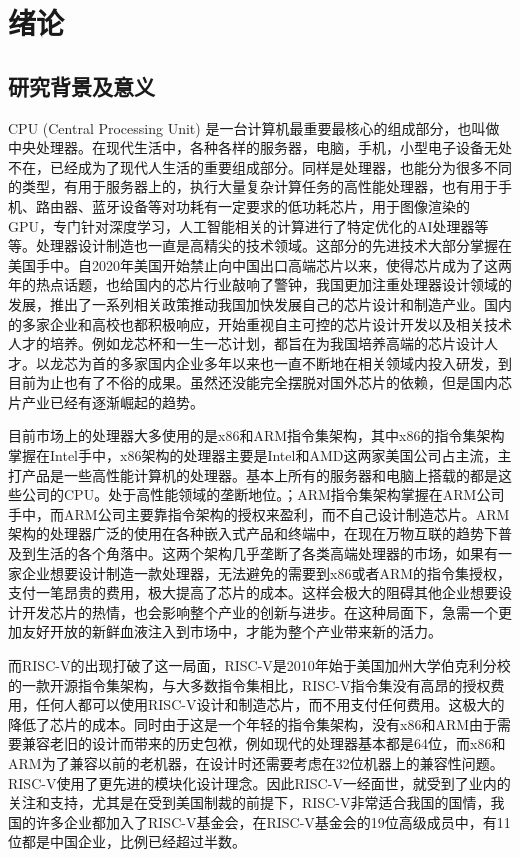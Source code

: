 
\chapter{绪论}

\section{研究背景及意义}
CPU (Central Processing Unit) 是一台计算机最重要最核心的组成部分，也叫做中央处理器。在现代生活中，各种各样的服务器，电脑，手机，小型电子设备无处不在，已经成为了现代人生活的重要组成部分。同样是处理器，也能分为很多不同的类型，有用于服务器上的，执行大量复杂计算任务的高性能处理器，也有用于手机、路由器、蓝牙设备等对功耗有一定要求的低功耗芯片，用于图像渲染的GPU，专门针对深度学习，人工智能相关的计算进行了特定优化的AI处理器等等。处理器设计制造也一直是高精尖的技术领域。这部分的先进技术大部分掌握在美国手中。自2020年美国开始禁止向中国出口高端芯片以来，使得芯片成为了这两年的热点话题，也给国内的芯片行业敲响了警钟，我国更加注重处理器设计领域的发展，推出了一系列相关政策推动我国加快发展自己的芯片设计和制造产业。国内的多家企业和高校也都积极响应，开始重视自主可控的芯片设计开发以及相关技术人才的培养。例如龙芯杯和一生一芯计划，都旨在为我国培养高端的芯片设计人才。以龙芯为首的多家国内企业多年以来也一直不断地在相关领域内投入研发，到目前为止也有了不俗的成果。虽然还没能完全摆脱对国外芯片的依赖，但是国内芯片产业已经有逐渐崛起的趋势。

目前市场上的处理器大多使用的是x86和ARM指令集架构，其中x86的指令集架构掌握在Intel手中，x86架构的处理器主要是Intel和AMD这两家美国公司占主流，主打产品是一些高性能计算机的处理器。基本上所有的服务器和电脑上搭载的都是这些公司的CPU。处于高性能领域的垄断地位。；ARM指令集架构掌握在ARM公司手中，而ARM公司主要靠指令架构的授权来盈利，而不自己设计制造芯片。ARM架构的处理器广泛的使用在各种嵌入式产品和终端中，在现在万物互联的趋势下普及到生活的各个角落中。这两个架构几乎垄断了各类高端处理器的市场，如果有一家企业想要设计制造一款处理器，无法避免的需要到x86或者ARM的指令集授权，支付一笔昂贵的费用，极大提高了芯片的成本。这样会极大的阻碍其他企业想要设计开发芯片的热情，也会影响整个产业的创新与进步。在这种局面下，急需一个更加友好开放的新鲜血液注入到市场中，才能为整个产业带来新的活力。

而RISC-V的出现打破了这一局面，RISC-V是2010年始于美国加州大学伯克利分校的一款开源指令集架构\cite{riscv-overview}，与大多数指令集相比，RISC-V指令集没有高昂的授权费用，任何人都可以使用RISC-V设计和制造芯片，而不用支付任何费用。这极大的降低了芯片的成本。同时由于这是一个年轻的指令集架构，没有x86和ARM由于需要兼容老旧的设计而带来的历史包袱，例如现代的处理器基本都是64位，而x86和ARM为了兼容以前的老机器，在设计时还需要考虑在32位机器上的兼容性问题。RISC-V使用了更先进的模块化设计理念。因此RISC-V一经面世，就受到了业内的关注和支持，尤其是在受到美国制裁的前提下，RISC-V非常适合我国的国情，我国的许多企业都加入了RISC-V基金会，在RISC-V基金会的19位高级成员中，有11位都是中国企业，比例已经超过半数。

